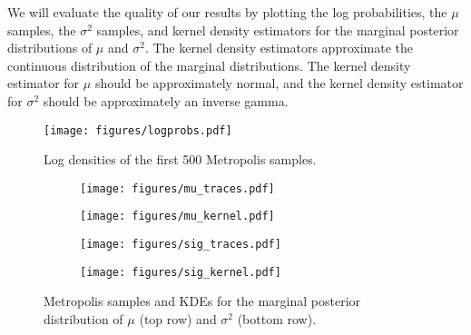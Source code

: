 We will evaluate the quality of our results by plotting the log probabilities, the $\mu$ samples, the $\sigma^2$ samples, and kernel density estimators for the marginal posterior distributions of $\mu$ and $\sigma^2$. 
The kernel density estimators approximate the continuous distribution of the marginal distributions. 
The kernel density estimator for $\mu$ should be approximately normal, and the kernel density estimator for $\sigma^2$ should be approximately an inverse gamma.
\begin{figure}[H]
    \centering
    \texttt{[image: figures/logprobs.pdf]}
    \caption{Log densities of the first 500 Metropolis samples.}
    \label{fig:logprobs}
\end{figure}

\begin{figure}[H]
    \begin{subfigure}[b]{.49\textwidth}
        \centering
        \texttt{[image: figures/mu\_traces.pdf]}
    \end{subfigure}
    \begin{subfigure}[b]{.49\textwidth}
        \centering
        \texttt{[image: figures/mu\_kernel.pdf]}
    \end{subfigure}
    \begin{subfigure}[b]{.49\textwidth}
        \centering
        \texttt{[image: figures/sig\_traces.pdf]}
    \end{subfigure}
    \begin{subfigure}[b]{.49\textwidth}
        \centering
        \texttt{[image: figures/sig\_kernel.pdf]}
    \end{subfigure}
\caption{Metropolis samples and KDEs for the marginal posterior distribution of $\mu$ (top row) and $\sigma^2$ (bottom row).}
\label{fig:metropolis_results}
\end{figure}


